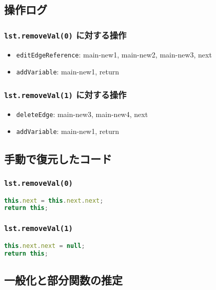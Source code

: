 \documentclass{article}
\begin{document}
\subsection{操作ログ}

\subsubsection{\texttt{lst.removeVal(0)} に対する操作}
\begin{itemize}
  \item \texttt{editEdgeReference}: main-new1, main-new2, main-new3, next
  \item \texttt{addVariable}: main-new1, return
\end{itemize}

\subsubsection{\texttt{lst.removeVal(1)} に対する操作}
\begin{itemize}
  \item \texttt{deleteEdge}: main-new3, main-new4, next
  \item \texttt{addVariable}: main-new1, return
\end{itemize}

\subsection{手動で復元したコード}

\subsubsection{\texttt{lst.removeVal(0)}}
\begin{lstlisting}[language=JavaScript]
this.next = this.next.next;
return this;
\end{lstlisting}

\subsubsection{\texttt{lst.removeVal(1)}}
\begin{lstlisting}[language=JavaScript]
this.next.next = null;
return this;
\end{lstlisting}

\subsection{一般化と部分関数の推定}
\end{document}
